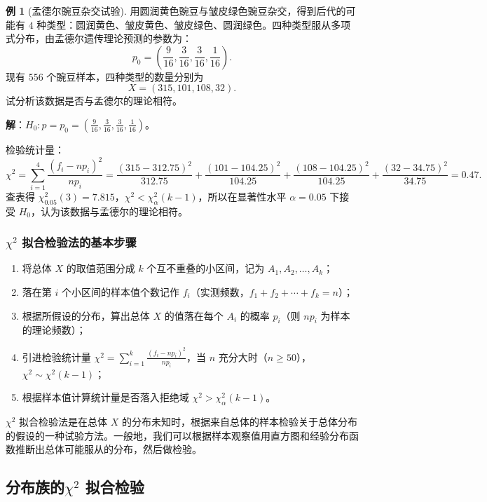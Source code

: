 \documentclass[11pt,a4paper]{report}
\theoremstyle{definition}
\newtheorem{example}{例}[chapter]
\begin{document}
\begin{example}[孟德尔豌豆杂交试验]
用圆润黄色豌豆与皱皮绿色豌豆杂交，得到后代的可能有 $4$ 种类型：圆润黄色、皱皮黄色、皱皮绿色、圆润绿色。四种类型服从多项式分布，由孟德尔遗传理论预测的参数为：
\[
p_{0}=\left(\frac{9}{16},\frac{3}{16},\frac{3}{16},\frac{1}{16}\right).
\]
现有 $556$ 个豌豆样本，四种类型的数量分别为
\[
X=(315,101,108,32).
\]
试分析该数据是否与孟德尔的理论相符。

\textbf{解}：$H_{0}\colon p=p_{0}=\left(\frac{9}{16},\frac{3}{16},\frac{3}{16},\frac{1}{16}\right)$。

检验统计量：
\[
\chi^{2}=\sum_{i=1}^{4}\frac{(f_{i}-np_{i})^{2}}{np_{i}}
=\frac{(315-312.75)^{2}}{312.75}+\frac{(101-104.25)^{2}}{104.25}+\frac{(108-104.25)^{2}}{104.25}+\frac{(32-34.75)^{2}}{34.75}
=0.47.
\]
查表得 $\chi_{0.05}^{2}(3)=7.815$，$\chi^{2}<\chi_{\alpha}^{2}(k-1)$，所以在显著性水平 $\alpha=0.05$ 下接受 $H_{0}$，认为该数据与孟德尔的理论相符。
\end{example}

\subsubsection*{$\chi^{2}$ 拟合检验法的基本步骤}

\begin{enumerate}[label=\arabic*.,leftmargin=2em]
    \item 将总体 $X$ 的取值范围分成 $k$ 个互不重叠的小区间，记为 $A_{1},A_{2},\ldots,A_{k}$；
    \item 落在第 $i$ 个小区间的样本值个数记作 $f_{i}$（实测频数，$f_{1}+f_{2}+\cdots+f_{k}=n$）；
    \item 根据所假设的分布，算出总体 $X$ 的值落在每个 $A_{i}$ 的概率 $p_{i}$（则 $np_{i}$ 为样本的理论频数）；
    \item 引进检验统计量 $\chi^{2}=\sum_{i=1}^{k}\frac{(f_{i}-np_{i})^{2}}{np_{i}}$，当 $n$ 充分大时（$n\geq 50$），$\chi^{2}\sim\chi^{2}(k-1)$；
    \item 根据样本值计算统计量是否落入拒绝域 $\chi^{2}>\chi_{\alpha}^{2}(k-1)$。
\end{enumerate}

$\chi^{2}$ 拟合检验法是在总体 $X$ 的分布未知时，根据来自总体的样本检验关于总体分布的假设的一种试验方法。一般地，我们可以根据样本观察值用直方图和经验分布函数推断出总体可能服从的分布，然后做检验。

\subsection{分布族的\texorpdfstring{$\chi^{2}$}{chi-squared} 拟合检验}
\end{document}
